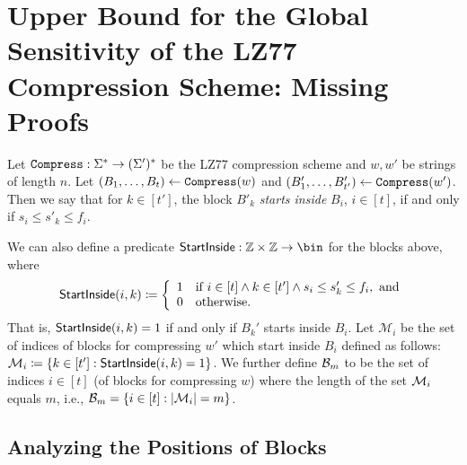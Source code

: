 \section{Upper Bound for the Global Sensitivity of the LZ77 Compression Scheme: Missing Proofs}



\begin{definition}
Let $\mathtt{Compress}:\Sigma^*\rightarrow(\Sigma')^*$ be the LZ77 compression scheme and $w,w'$ be strings of length $n$. Let $(B_1,\ldots,B_t)\gets\mathtt{Compress}(w)$ and $(B_1',\ldots,B_{t'}')\gets\mathtt{Compress}(w')$. Then we say that for $k \in [t']$, the block $B'_{k}$ \emph{starts inside} $B_i$, $i \in[t]$, if and only if $s_{i} \leq s'_k \leq f_i$.

We can also define a predicate $\startinside:\mathbb{Z}\times\mathbb{Z}\rightarrow\bin$ for the blocks above, where
\[\mathsf{StartInside}(i,k)\coloneqq\left\{\begin{array}{ll}
    1 & \text{if } i\in[t]\wedge k\in[t']\wedge s_i\leq s_k'\leq f_i,\text{ and}\\
    0 & \text{otherwise.}
    \end{array}\right.\]
    That is, $\mathsf{StartInside}(i,k)=1$ if and only if $B_k'$ starts inside $B_i$.
    Let  $\mathcal{M}_i$ be the set of indices of blocks for compressing $w'$ which start inside $B_i$ defined as follows:     $\mathcal{M}_i\coloneqq \{k \in [t']: \mathsf{StartInside}(i,k)=1 \}$.
We further define ${\mathcal{B}}_m$ to be the set of indices $i\in[t]$ (of blocks for compressing $w$) where the length of the set $\mathcal{M}_i$ equals $m$, i.e., ${\mathcal{B}}_m = \{i \in [t]: |\mathcal{M}_i|=m\}$.
\end{definition}

\subsection{Analyzing the Positions of Blocks}

\begin{remindertheorem}{}
    \lemstartinsidestatement
\end{remindertheorem}  

